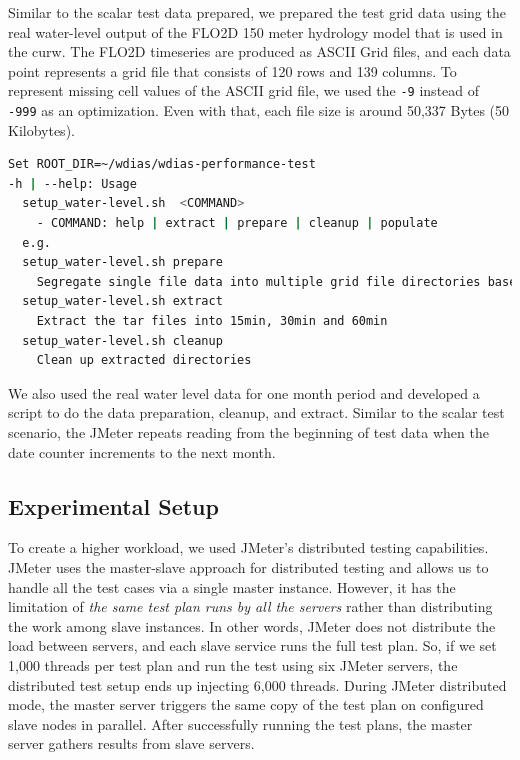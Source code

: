 Similar to the scalar test data prepared, we prepared the test grid data using the real water-level output of the FLO2D 150 meter hydrology model that is used in the \acrshort{curw}. The FLO2D timeseries are produced as ASCII Grid files, and each data point represents a grid file that consists of 120 rows and 139 columns. To represent missing cell values of the ASCII grid file, we used the \texttt{-9} instead of \texttt{-999} as an optimization. Even with that, each file size is around 50,337 Bytes (50 Kilobytes).

\begin{minipage}{\linewidth}
\begin{lstlisting}[language=sh, caption= Preparation of water-level data.]
Set ROOT_DIR=~/wdias/wdias-performance-test
-h | --help: Usage
  setup_water-level.sh  <COMMAND>
    - COMMAND: help | extract | prepare | cleanup | populate
  e.g.
  setup_water-level.sh prepare
    Segregate single file data into multiple grid file directories based on date. And separate into main directories of 15min, 30min, 60min and create tar files
  setup_water-level.sh extract
    Extract the tar files into 15min, 30min and 60min
  setup_water-level.sh cleanup
    Clean up extracted directories
\end{lstlisting}
\end{minipage}

We also used the real water level data for one month period and developed a script to do the data preparation, cleanup, and extract. Similar to the scalar test scenario, the JMeter repeats reading from the beginning of test data when the date counter increments to the next month.


\subsection{Experimental Setup}
\label{subse:experimental_setup}

To create a higher workload, we used JMeter's distributed testing capabilities. JMeter uses the master-slave approach for distributed testing and allows us to handle all the test cases via a single master instance. However, it has the limitation of \emph{the same test plan runs by all the servers} rather than distributing the work among slave instances. In other words, JMeter does not distribute the load between servers, and each slave service runs the full test plan. So, if we set 1,000 threads per test plan and run the test using six JMeter servers, the distributed test setup ends up injecting 6,000 threads. During JMeter distributed mode, the master server triggers the same copy of the test plan on configured slave nodes in parallel. After successfully running the test plans, the master server gathers results from slave servers.

